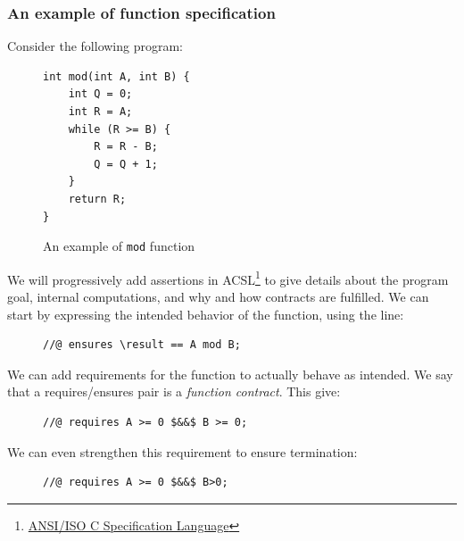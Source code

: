 \documentclass[toc, titlepaged]{../cs-classes/cs-classes}
\begin{document}
\subsubsection{An example of function specification}
Consider the following program:
\begin{figure}[H]
    \centering
    \begin{minipage}{0.3\textwidth}
        \begin{verbatim}
int mod(int A, int B) {
    int Q = 0;
    int R = A;
    while (R >= B) {
        R = R - B;
        Q = Q + 1;
    }
    return R;
}
        \end{verbatim}
    \end{minipage}
    \caption{An example of \texttt{mod} function}
\end{figure}
We will progressively add assertions in ACSL\footnote{\href{https://www.frama-c.com/html/acsl.html}{ANSI/ISO C Specification Language}} to give details about the program goal, internal computations, and why and how contracts are fulfilled. We can start by expressing the intended behavior of the function, using the line:
\begin{figure}[H]
    \centering
    \begin{minipage}{0.4\textwidth}
        \begin{verbatim}
//@ ensures \result == A mod B;
        \end{verbatim}
    \end{minipage}
\end{figure}
We can add requirements for the function to actually behave as intended. We say that a requires/ensures pair is a \emph{function contract}. This give:
\begin{figure}[H]
    \centering
    \begin{minipage}{0.4\textwidth}
        \begin{verbatim}
//@ requires A >= 0 $&&$ B >= 0;
        \end{verbatim}
    \end{minipage}
\end{figure}
We can even strengthen this requirement to ensure termination:
\begin{figure}[H]
    \centering
    \begin{minipage}{0.4\textwidth}
        \begin{verbatim}
//@ requires A >= 0 $&&$ B>0;
        \end{verbatim}
    \end{minipage}
\end{figure}
\end{document}
